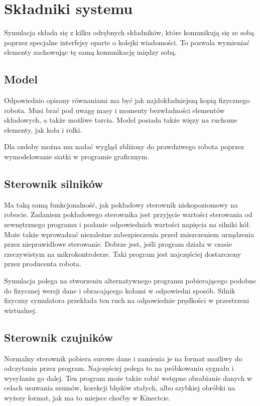 \section{Składniki systemu}
Symulacja składa się z kilku odrębnych składników, które komunikują się ze sobą poprzez specjalne interfejsy oparte o kolejki wiadomości.
To pozwala wymieniać elementy zachowując tę samą komunikację między sobą.

\subsection{Model}
 Odpowiednio opisany równaniami ma być jak najdokładniejszą kopią fizycznego robota.
 Musi brać pod uwagę masy i momenty bezwładności elementów składowych, a także możliwe tarcia.
 Model posiada także więzy na ruchome elementy, jak koła i rolki.
 
 Dla ozdoby można mu nadać wygląd zbliżony do prawdziwego robota poprzez wymodelowanie siatki w programie graficznym.

 \subsection{Sterownik silników}
 Ma taką samą funkcjonalność, jak pokładowy sterownik niskopoziomowy na robocie.
 Zadaniem pokładowego sterownika jest przyjęcie wartości sterowania od zewnętrznego programu i podanie odpowiednich wartości napięcia na silniki kół.
 Może także wprowadzać niezależne zabezpieczenia przed zniszczeniem urządzenia przez nieprawidłowe sterowanie.
 Dobrze jest, jeśli program działa w czasie rzeczywistym na mikrokontrolerze.
 Taki program jest najczęściej dostarczony przez producenta robota.
 
 Symulacja polega na stworzeniu alternatywnego programu pobierającego podobne do fizycznej wersji dane i obracającego kołami w odpowiedni sposób.
 Silnik fizyczny symulatora przekłada ten ruch na odpowiednie prędkości w przestrzeni wirtualnej.
 
 
 \subsection{Sterownik czujników}
 Normalny sterownik pobiera surowe dane i zamienia je na format możliwy do odczytania przez program.
 Najczęściej polega to na próbkowaniu sygnału i wysyłaniu go dalej.
 Ten program może także robić wstępne obrabianie danych w celach usuwania szumów, korekcji błędów stałych, albo szybkiej obróbki na wyższy format, jak ma to miejsce choćby w Kinectcie.
 
